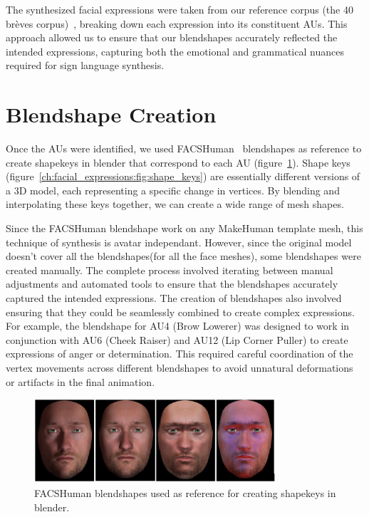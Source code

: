 \documentclass[../../main]{subfiles}
\begin{document}
The synthesized facial expressions were taken from our reference corpus (the 40 brèves corpus)~\cite{challant2024extending, challant2022first}, breaking down each expression into its constituent AUs. This approach allowed us to ensure that our blendshapes accurately reflected the intended expressions, capturing both the emotional and grammatical nuances required for sign language synthesis.

\section{Blendshape Creation}
\label{ch:facial_expressions:blendshape_creation}

Once the AUs were identified, we used FACSHuman~\cite{gilbert2021facshuman} blendshapes as reference to create shapekeys in blender that correspond to each AU (figure~\ref{ch:facial_expressions:fig:facshuman_blendshapes}). Shape keys (figure~\ref{ch:facial_expressions:fig:shape_keys}) are essentially different versions of a 3D model, each representing a specific change in vertices. By blending and interpolating these keys together, we can create a wide range of mesh shapes.

Since the FACSHuman blendshape work on any MakeHuman template mesh, this technique of synthesis is avatar independant. However, since the original model doesn't cover all the blendshapes(for all the face meshes), some blendshapes were created manually. The complete process involved iterating between manual adjustments and automated tools to ensure that the blendshapes accurately captured the intended expressions. The creation of blendshapes also involved ensuring that they could be seamlessly combined to create complex expressions. For example, the blendshape for AU4 (Brow Lowerer) was designed to work in conjunction with AU6 (Cheek Raiser) and AU12 (Lip Corner Puller) to create expressions of anger or determination. This required careful coordination of the vertex movements across different blendshapes to avoid unnatural deformations or artifacts in the final animation.

\begin{figure}
    \centering
    \includegraphics[width=0.8\textwidth]{chapters/facial_expressions/images/facshuman_blendshapes.png}
    \caption{FACSHuman blendshapes used as reference for creating shapekeys in blender.}
    \label{ch:facial_expressions:fig:facshuman_blendshapes}
\end{figure}
\end{document}
